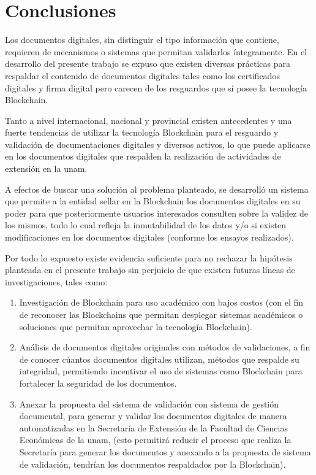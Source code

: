 \chapter{Conclusiones}

Los documentos digitales, sin distinguir el tipo información que contiene, requieren
de mecanismos o sistemas que permitan validarlos íntegramente. En el desarrollo del 
presente trabajo se expuso que existen diversas prácticas para respaldar el contenido
de documentos digitales  tales como los certificados digitales y firma digital pero carecen
de los resguardos que sí posee la tecnología Blockchain.

Tanto  a nivel internacional, nacional y provincial existen antecedentes y una fuerte tendencias
de utilizar la tecnología Blockchain para el resguardo y validación de documentaciones digitales 
y diversos activos, lo que puede aplicarse en los documentos digitales 
que respalden la realización de actividades de extensión 
en la \gls{unam}.

A efectos de buscar una solución al problema planteado, se desarrolló un sistema 
que permite a la entidad sellar en la Blockchain los documentos digitales en su poder
para que  posteriormente usuarios interesados consulten sobre la validez 
de los mismos, todo lo cual refleja la inmutabilidad de los datos y/o si existen
modificaciones en los documentos digitales (conforme los ensayos realizados). 


Por todo lo expuesto existe evidencia suficiente para no rechazar la hipótesis planteada
en el presente trabajo sin perjuicio de que existen futuras líneas de investigaciones,
tales como: 

\begin{enumerate}
    \item Investigación de  Blockchain para uso académico con bajos costos (con el fin de reconocer 
    las  Blockchains que permitan desplegar sistemas académicos o soluciones que permitan aprovechar 
    la tecnología  Blockchain).
    \item Análisis de documentos digitales originales con métodos de validaciones, a fin de  conocer cúantos documentos digitales 
    utilizan,  métodos que respalde su integridad, permitiendo incentivar el uso de sistemas como  Blockchain para fortalecer la seguridad de los documentos.
    \item Anexar la propuesta del sistema de validación con sistema de gestión documental, para generar y validar  los documentos digitales de manera
    automatizadas en la Secretaría de Extensión de la Facultad de Ciencias Económicas de la \gls{unam}, (esto permitirá reducir el proceso que realiza la Secretaría
    para generar los documentos y anexando a la propuesta de sistema de validación, tendrían los documentos respaldados por la  Blockchain).   
\end{enumerate}




